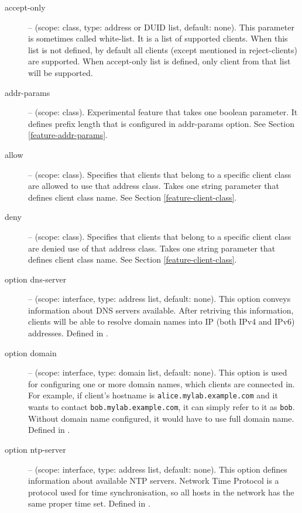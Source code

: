 \begin{description}
\item[accept-only] -- (scope: class, type: address or DUID list,
            default: none). This parameter is sometimes called
            white-list. It is a list of supported clients. When this
            list is not defined, by default all clients (except
            mentioned in reject-clients) are supported. When
            accept-only list is defined, only client from that list
            will be supported.

\item[addr-params] -- (scope: class). Experimental feature that takes 
  one boolean parameter. It defines prefix length that is configured
  in addr-params option. See Section \ref{feature-addr-params}.

\item[allow] -- (scope: class). Specifies that clients that belong to
  a specific client class are allowed to use that address class. Takes
  one string parameter that defines client class name. See Section
  \ref{feature-client-class}.

\item[deny] -- (scope: class). Specifies that clients that belong to
  a specific client class are denied use of that address class. Takes
  one string parameter that defines client class name. See Section
  \ref{feature-client-class}.

 \item[option dns-server] -- (scope: interface, type: address list, default:
   none). This option conveys information about DNS servers
   available. After retriving this information, clients will be able
   to resolve domain names into IP (both IPv4 and IPv6)
   addresses. Defined in \cite{rfc3596}.

 \item[option domain] -- (scope: interface, type: domain list, default:
   none). This option is used for configuring one or more domain
   names, which clients are connected in. For example, if client's
   hostname is \verb+alice.mylab.example.com+ and it wants to contact
   \verb+bob.mylab.example.com+, it can simply refer to it as
   \verb+bob+. Without domain name configured, it would have to use
   full domain name. Defined in \cite{rfc3596}.

 \item[option ntp-server] -- (scope: interface, type: address list, default:
   none). This option defines information about available NTP
   servers. Network Time Protocol \cite{rfc2030} is a protocol used
   for time synchronisation, so all hosts in the network has the same
   proper time set. Defined in \cite{rfc4075}.


\end{description}
